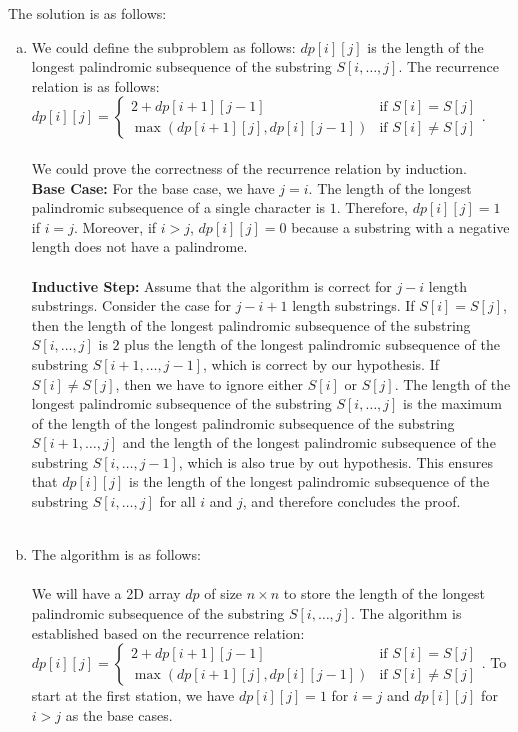 \documentclass[10pt]{article}
\begin{document}
\begin{solution}
The solution is as follows:
    \begin{enumerate} [(a)]
        \item We could define the subproblem as follows: $dp[i][j]$ is the length of the longest palindromic subsequence of the substring $S[i, \ldots, j]$. The recurrence relation is as follows: $dp[i][j] = \begin{cases}  2 + dp[i+1][j-1] & \text{if } S[i] = S[j] \\ \max(dp[i+1][j], dp[i][j-1]) & \text{if } S[i] \neq S[j] \end{cases}$. \\\\
        We could prove the correctness of the recurrence relation by induction. \\
        \textbf{Base Case:} For the base case, we have $j = i$. The length of the longest palindromic subsequence of a single character is $1$. Therefore, $dp[i][j] = 1$ if $i = j$. Moreover, if $i > j$, $dp[i][j] = 0$ because a substring with a negative length does not have a palindrome.\\\\
        \textbf{Inductive Step:} Assume that the algorithm is correct for $j-i$ length substrings. Consider the case for $j-i+1$ length substrings. If $S[i] = S[j]$, then the length of the longest palindromic subsequence of the substring $S[i, \ldots, j]$ is $2$ plus the length of the longest palindromic subsequence of the substring $S[i+1, \ldots, j-1]$, which is correct by our hypothesis. If $S[i] \neq S[j]$, then we have to ignore either $S[i]$ or $S[j]$. The length of the longest palindromic subsequence of the substring $S[i, \ldots, j]$ is the maximum of the length of the longest palindromic subsequence of the substring $S[i+1, \ldots, j]$ and the length of the longest palindromic subsequence of the substring $S[i, \ldots, j-1]$, which is also true by out hypothesis. This ensures that $dp[i][j]$ is the length of the longest palindromic subsequence of the substring $S[i, \ldots, j]$ for all $i$ and $j$, and therefore concludes the proof.  \\\\
        \item The algorithm is as follows: \\\\
            We will have a 2D array $dp$ of size $n \times n$ to store the length of the longest palindromic subsequence of the substring $S[i, \ldots, j]$. The algorithm is established based on the recurrence relation: $dp[i][j] = \begin{cases}  2 + dp[i+1][j-1] & \text{if } S[i] = S[j] \\ \max(dp[i+1][j], dp[i][j-1]) & \text{if } S[i] \neq S[j] \end{cases}$. To start at the first station, we have $dp[i][j] = 1$ for $i = j$ and $dp[i][j]$ for $i > j$ as the base cases. 

\end{enumerate}
\end{solution}
\end{document}

